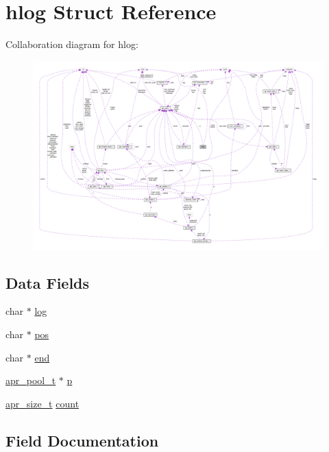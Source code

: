 \hypertarget{structhlog}{}\section{hlog Struct Reference}
\label{structhlog}


Collaboration diagram for hlog\+:
\nopagebreak
\begin{figure}[H]
\begin{center}
\leavevmode
\includegraphics[width=350pt]{structhlog__coll__graph}
\end{center}
\end{figure}
\subsection*{Data Fields}
\begin{DoxyCompactItemize}
\item 
char $\ast$ \hyperlink{structhlog_a703bb40ae21b0e8f4b8a82ba56117aac}{log}
\item 
char $\ast$ \hyperlink{structhlog_a1d3b7c879e261fb41cd4181ddc3d18e3}{pos}
\item 
char $\ast$ \hyperlink{structhlog_aaa639f87e7f9b6570b35651765f92ce8}{end}
\item 
\hyperlink{structapr__pool__t}{apr\+\_\+pool\+\_\+t} $\ast$ \hyperlink{structhlog_a7a31231c22aca52f88e81a29e15704d2}{p}
\item 
\hyperlink{group__apr__platform_gaaa72b2253f6f3032cefea5712a27540e}{apr\+\_\+size\+\_\+t} \hyperlink{structhlog_a89568d60305cd226a05175e24f6ec220}{count}
\end{DoxyCompactItemize}


\subsection{Field Documentation}
